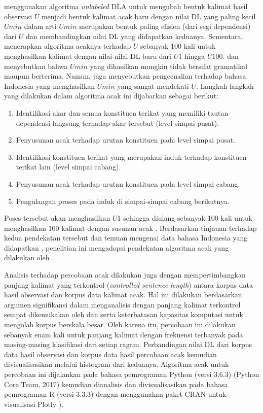 \cite{gildea2010grammars} menggunakan algoritma \textit{unlabeled} DLA untuk mengubah bentuk kalimat hasil observasi $U$ menjadi bentuk kalimat acak baru dengan nilai DL yang paling kecil $Umin$ dalam arti $Umin$ merupakan bentuk paling efisien (dari segi dependensi) dari $U$ dan membandingkan nilai DL yang didapatkan keduanya. Sementara, \cite{futrell2015large} menerapkan algoritma acaknya terhadap $U$ sebanyak 100 kali untuk menghasilkan kalimat dengan nilai-nilai DL baru dari $U1$ hingga $U100$. \cite{futrell2015large} dan \cite{gildea2010grammars} menyebutkan bahwa $Umin$ yang dihasilkan mungkin tidak bersifat gramatikal maupun berterima. Namun, \cite{futrell2015large} juga menyebutkan pengecualian terhadap bahasa Indonesia yang menghasilkan $Umin$ yang sangat mendekati $U$. Langkah-langkah yang dilakukan dalam algoritma acak ini dijabarkan sebagai berikut:
\begin{enumerate}
\item Identifikasi akar dan semua konstituen terikat yang memiliki tautan dependensi langsung terhadap akar tersebut (level simpai pusat).
\item Penyusunan acak terhadap urutan konstituen pada level simpai pusat.
\item Identifikasi konstituen terikat yang merupakan induk terhadap konstituen terikat lain (level simpai cabang).
\item Penyusunan acak terhadap urutan konstituen pada level simpai cabang.
\item Pengulangan proses pada induk di simpai-simpai cabang berikutnya.
\end{enumerate}
Poses tersebut akan menghasilkan $U1$ sehingga diulang sebanyak 100 kali untuk menghasilkan 100 kalimat dengan susunan acak \citep{futrell2015large}. Berdasarkan tinjauan terhadap kedua pendekatan tersebut dan temuan mengenai data bahasa Indonesia yang didapatkan \cite{futrell2015large}, penelitian ini mengadopsi pendekatan algoritma acak yang dilakukan oleh \cite{futrell2015large}.

Analisis terhadap percobaan acak dilakukan juga dengan mempertimbangkan panjang kalimat yang terkontrol (\textit{controlled sentence length}) antara korpus data hasil observasi dan korpus data kalimat acak. Hal ini dilakukan berdasarkan argumen signifikansi dalam menganalisis dengan panjang kalimat terkontrol sempat dikemukakan oleh \cite{ferrer2014risks} dan \cite{jiang2015effects} serta keterbatasan kapasitas komputasi untuk mengolah korpus berskala besar. Oleh karena itu, percobaan ini dilakukan sebanyak enam kali untuk panjang kalimat dengan frekuensi terbanyak pada masing-masing klasifikasi dari setiap ragam. Perbandingan nilai DL dari korpus data hasil observasi dan korpus data hasil percobaan acak kemudian divisualisasikan melalui histogram dari keduanya. Algoritma acak untuk percobaan ini dijalankan pada bahasa pemrograman Python (versi 3.6.3) (Python Core Team, 2017) kemudian dianalisis dan divisualisasikan pada bahasa pemrograman R (versi 3.3.3) \citep{r2017project} dengan menggunakan paket CRAN untuk visualisasi Plotly \citep{sievert2017plotly}).

